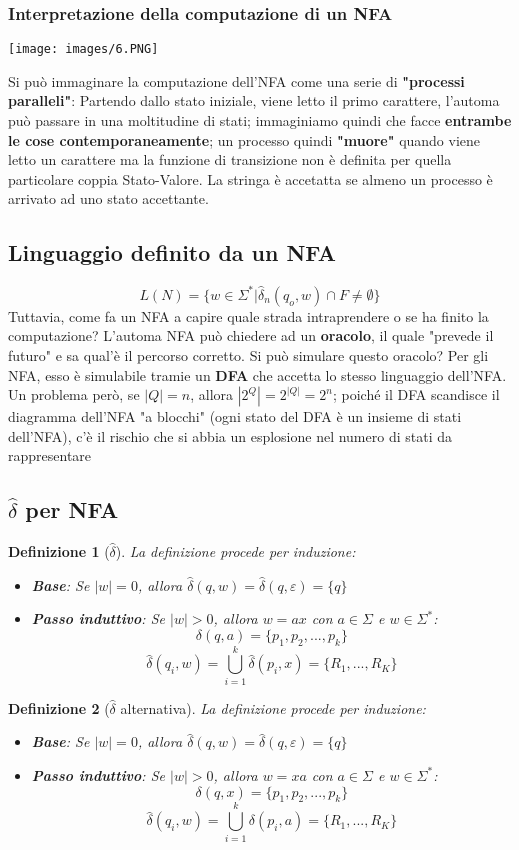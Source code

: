 \documentclass[12pt]{article}
\newtheorem{Definizione}{Definizione}[subsection]
\begin{document}
\subsubsection{Interpretazione della computazione di un NFA}
\begin{center}
    \texttt{[image: images/6.PNG]}
\end{center}
Si può immaginare la computazione dell'NFA come una serie di \textbf{"processi paralleli"}: Partendo dallo stato iniziale, viene letto il primo carattere, l'automa può passare in una moltitudine di stati; immaginiamo quindi che facce \textbf{entrambe le cose contemporaneamente}; un processo quindi \textbf{"muore"} quando viene letto un carattere ma la funzione di transizione non è definita per quella particolare coppia Stato-Valore. La stringa è accetatta se almeno un processo è arrivato ad uno stato accettante.
\subsection{Linguaggio definito da un NFA}
$$L(N) = \{w \in \Sigma^* | \hat{\delta}_n(q_o, w) \cap F \neq \emptyset\}$$
Tuttavia, come fa un NFA a capire quale strada intraprendere o se ha finito la computazione? L'automa NFA può chiedere ad un \textbf{oracolo}, il quale "prevede il futuro" e sa qual'è il percorso corretto. Si può simulare questo oracolo? Per gli NFA, esso è simulabile tramie un \textbf{DFA} che accetta lo stesso linguaggio dell'NFA. Un problema però, se $|Q| = n$, allora $|2^Q| = 2^{|Q|} = 2^n$; poiché il DFA scandisce il diagramma dell'NFA "a blocchi" (ogni stato del DFA è un insieme di stati dell'NFA), c'è il rischio che si abbia un esplosione nel numero di stati da rappresentare
\subsection{$\hat{\delta}$ per NFA}
\begin{Definizione}[$\hat{\delta}$]
La definizione procede per induzione:
\begin{itemize}
    \item \textbf{Base}: Se $|w| = 0$, allora $\hat{\delta}(q,w) = \hat{\delta}(q, \varepsilon) = \{q\}$
    \item  \textbf{Passo induttivo}: Se $|w| > 0$, allora $w = ax$ con $a \in \Sigma$ e $w \in \Sigma^*$:
    $$\delta(q, a) = \{p_1, p_2, ..., p_k\}$$
    $$\hat{\delta}(q_i, w) = \bigcup_{i=1}^k \hat{\delta}(p_i, x) = \{R_1, ..., R_K\}$$
\end{itemize}
\end{Definizione}
\begin{Definizione}[$\hat{\delta}$ alternativa]
La definizione procede per induzione:
\begin{itemize}
    \item \textbf{Base}: Se $|w| = 0$, allora $\hat{\delta}(q,w) = \hat{\delta}(q, \varepsilon) = \{q\}$
    \item  \textbf{Passo induttivo}: Se $|w| > 0$, allora $w = xa$ con $a \in \Sigma$ e $w \in \Sigma^*$:
    $$\delta(q, x) = \{p_1, p_2, ..., p_k\}$$
    $$\hat{\delta}(q_i, w) = \bigcup_{i=1}^k \delta(p_i, a) = \{R_1, ..., R_K\}$$
\end{itemize}
\end{Definizione}
\end{document}

